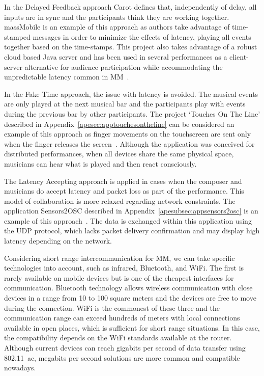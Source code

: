 In the Delayed Feedback approach Carot defines that, independently of delay, all inputs are in sync and the participants think they are working together.
massMobile is an example of this approach as authors take advantage of time-stamped messages in order to minimize the effects of latency, playing all events together based on the time-stamps.
This project also takes advantage of a robust cloud based Java server and has been used in several performances as a client-server alternative for audience participation while accommodating the unpredictable latency common in MM~\citep{Weitzner2012massmobile}. 

In the Fake Time approach, the issue with latency is avoided.
The musical events are only played at the next musical bar and the participants play with events during the previous bar by other participants.
The project `Touches On The Line' described in Appendix~\ref{apesec:apptouchesontheline} can be considered an example of this approach as finger movements on the touchscreen are sent only when the finger releases the screen~\citep{deCarvalhoJunior2013touches}.
Although the application was conceived for distributed performances, when all devices share the same physical space, musicians can hear what is played and then react consciously.

The Latency Accepting approach is applied in cases when the composer and musicians do accept latency and packet loss as part of the performance.
This model of collaboration is more relaxed regarding network constraints.
The application Sensors2OSC described in Appendix~\ref{apesubsec:appsensors2osc} is an example of this approach~\citep{deCarvalhoJunior2015sensors2osc}.
The data is exchanged within this application using the UDP protocol, which lacks packet delivery confirmation and may display high latency depending on the network.

Considering short range intercommunication for MM, we can take specific technologies into account, such as infrared, Bluetooth, and WiFi.
The first is rarely available on mobile devices but is one of the cheapest interfaces for communication.
Bluetooth technology allows wireless communication with close devices in a range from 10 to 100 square meters and the devices are free to move during the connection.
WiFi is the commonest of these three and the communication range can exceed hundreds of meters with local connections available in open places, which is sufficient for short range situations.
In this case, the compatibility depends on the WiFi standards available at the router. 
Although current devices can reach gigabits per second of data transfer using 802.11~ac, megabits per second solutions are more common and compatible nowadays.


